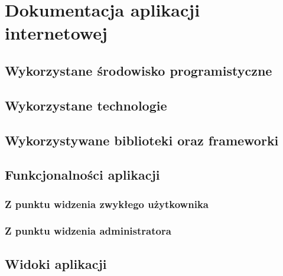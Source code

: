 \documentclass[a4paper]{article}
\begin{document}
\section{Dokumentacja aplikacji internetowej}

\subsection{Wykorzystane środowisko programistyczne}

\subsection{Wykorzystane technologie}

\subsection{Wykorzystywane biblioteki oraz frameworki}

\subsection{Funkcjonalności aplikacji}
\subsubsection{Z punktu widzenia zwykłego użytkownika}

\subsubsection{Z punktu widzenia administratora}

\subsection{Widoki aplikacji}

\begin{lstlisting}[caption={Kod pliku Screen.c}, label={sc}]
 
\end{lstlisting}
\end{document}
